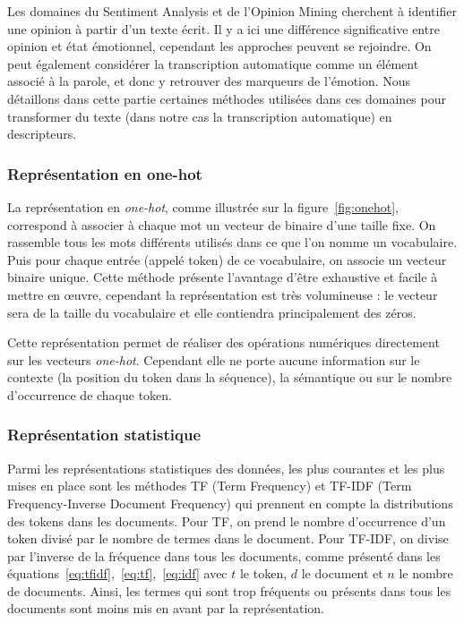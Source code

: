 Les domaines du Sentiment Analysis et de l'Opinion Mining cherchent à identifier une opinion à partir d'un texte écrit. Il y a ici une différence significative entre opinion et état émotionnel, cependant les approches peuvent se rejoindre. On peut également considérer la transcription automatique comme un élément associé à la parole, et donc y retrouver des marqueurs de l'émotion. Nous détaillons dans cette partie certaines méthodes utilisées dans ces domaines pour transformer du texte (dans notre cas la transcription automatique) en descripteurs.

\subsubsection{Représentation en one-hot}
La représentation en \textit{one-hot}, comme illustrée sur la figure~\ref{fig:onehot}, correspond à associer à chaque mot un vecteur de binaire d'une taille fixe. On rassemble tous les mots différents utilisés dans ce que l'on nomme un vocabulaire. Puis pour chaque entrée (appelé token) de ce vocabulaire, on associe un vecteur binaire unique. Cette méthode présente l'avantage d'être exhaustive et facile à mettre en œuvre, cependant la représentation est très volumineuse : le vecteur sera de la taille du vocabulaire et elle contiendra principalement des zéros.



Cette représentation permet de réaliser des opérations numériques directement sur les vecteurs \textit{one-hot}. Cependant elle ne porte aucune information sur le contexte (la position du token dans la séquence), la sémantique ou sur le nombre d’occurrence de chaque token.

\subsubsection{Représentation statistique}
Parmi les représentations statistiques des données, les plus courantes et les plus mises en place sont les méthodes TF (Term Frequency) et TF-IDF (Term Frequency-Inverse Document Frequency) qui prennent en compte la distributions des tokens dans les documents. Pour TF, on prend le nombre d’occurrence d'un token divisé par le nombre de termes dans le document. Pour TF-IDF, on divise par l'inverse de la fréquence dans tous les documents, comme présenté dans les équations~\ref{eq:tfidf},~\ref{eq:tf},~\ref{eq:idf} avec $t$ le token, $d$ le document et $n$ le nombre de documents. Ainsi, les termes qui sont trop fréquents ou présents dans tous les documents sont moins mis en avant par la représentation.

